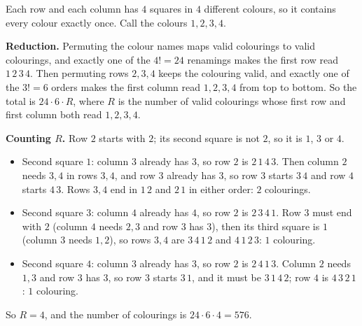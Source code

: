 Each row and each column has $4$ squares in $4$ different colours, so it contains every colour exactly once. Call the colours $1,2,3,4$.

\textbf{Reduction.} Permuting the colour names maps valid colourings to valid colourings, and exactly one of the $4!=24$ renamings makes the first row read $1\,2\,3\,4$. Then permuting rows $2,3,4$ keeps the colouring valid, and exactly one of the $3!=6$ orders makes the first column read $1,2,3,4$ from top to bottom. So the total is $24\cdot6\cdot R$, where $R$ is the number of valid colourings whose first row and first column both read $1,2,3,4$.

\textbf{Counting $R$.} Row $2$ starts with $2$; its second square is not $2$, so it is $1$, $3$ or $4$.
\begin{itemize}
\item Second square $1$: column $3$ already has $3$, so row $2$ is $2\,1\,4\,3$. Then column $2$ needs $3,4$ in rows $3,4$, and row $3$ already has $3$, so row $3$ starts $3\,4$ and row $4$ starts $4\,3$. Rows $3,4$ end in $1\,2$ and $2\,1$ in either order: $2$ colourings.
\item Second square $3$: column $4$ already has $4$, so row $2$ is $2\,3\,4\,1$. Row $3$ must end with $2$ (column $4$ needs $2,3$ and row $3$ has $3$), then its third square is $1$ (column $3$ needs $1,2$), so rows $3,4$ are $3\,4\,1\,2$ and $4\,1\,2\,3$: $1$ colouring.
\item Second square $4$: column $3$ already has $3$, so row $2$ is $2\,4\,1\,3$. Column $2$ needs $1,3$ and row $3$ has $3$, so row $3$ starts $3\,1$, and it must be $3\,1\,4\,2$; row $4$ is $4\,3\,2\,1$: $1$ colouring.
\end{itemize}
So $R=4$, and the number of colourings is $24\cdot6\cdot4=\boxed{576}$.
